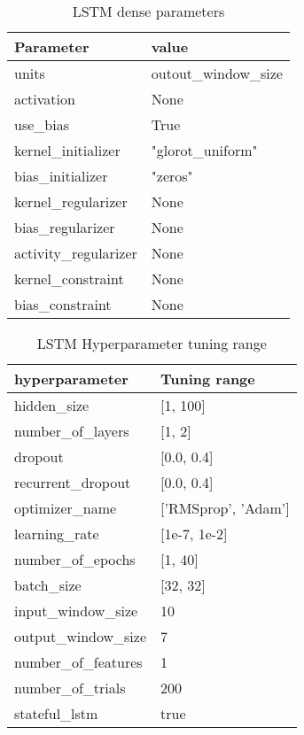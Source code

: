 \begin{table}[h]
  \centering
  \caption{LSTM dense parameters}
  \label{table:LSTM-dense-cell-parameters}
  \begin{tabular}{|l|l|}\hline
    Parameter             & value                \\ \hline
    \hline
    units                 & outout\_window\_size \\
    activation            & None                 \\
    use\_bias             & True                 \\
    kernel\_initializer   & "glorot\_uniform"    \\
    bias\_initializer     & "zeros"              \\
    kernel\_regularizer   & None                 \\
    bias\_regularizer     & None                 \\
    activity\_regularizer & None                 \\
    kernel\_constraint    & None                 \\
    bias\_constraint      & None                 \\
    \hline
  \end{tabular}
\end{table}

\begin{table}[h]
  \centering
  \caption{LSTM Hyperparameter tuning range}
  \label{table:LSTM-hyperparameters-tuning-range}
  \begin{tabular}{|l|l|}\hline
    hyperparameter       & Tuning range        \\ \hline
    \hline
    hidden\_size         & [1, 100]            \\
    number\_of\_layers   & [1, 2]              \\
    dropout              & [0.0, 0.4]          \\
    recurrent\_dropout   & [0.0, 0.4]          \\
    optimizer\_name      & ['RMSprop', 'Adam'] \\
    learning\_rate       & [1e-7, 1e-2]        \\
    number\_of\_epochs   & [1, 40]             \\
    batch\_size          & [32, 32]            \\
    input\_window\_size  & 10                  \\
    output\_window\_size & 7                   \\
    number\_of\_features & 1                   \\
    number\_of\_trials   & 200                 \\
    stateful\_lstm       & true                \\
    \hline
  \end{tabular}
\end{table}

